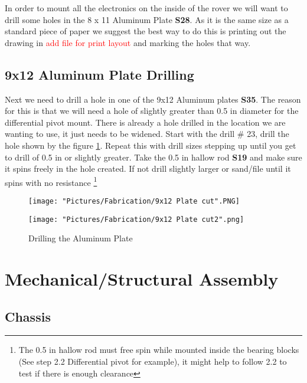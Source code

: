 \documentclass[12pt]{article}
\begin{document}
In order to mount all the electronics on the inside of the rover we will want to drill some holes in the 8 x 11 Aluminum Plate \textbf{S28}. As it is the same size as a standard piece of paper we suggest the best way to do this is printing out the drawing in \textcolor{red}{add file for print layout} and marking the holes that way. 

\subsection{9x12 Aluminum Plate Drilling}
Next we need to drill a hole in one of the 9x12 Aluminum plates \textbf{S35}. The reason for this is that we will need a hole of slightly greater than 0.5 in diameter for the differential pivot mount. There is already a hole drilled in the location we are wanting to use, it just needs to be widened. Start with the drill \# 23, drill the hole shown by the figure \ref{Drilling the Al plate}. Repeat this with drill sizes stepping up until you get to drill of 0.5 in or slightly greater. Take the 0.5 in hallow rod \textbf{S19} and make sure it spins freely in the hole created. If not drill slightly larger or sand/file until it spins with no resistance \footnote{The 0.5 in hallow rod must free spin while mounted inside the bearing blocks (See step 2.2 Differential pivot for example), it might help to follow 2.2 to test if there is enough clearance} 

\begin{figure}[H]
  \centering
  \begin{minipage}[b]{0.45\textwidth}
    \texttt{[image: "Pictures/Fabrication/9x12 Plate cut".PNG]}
  \end{minipage}
  \hfill
  \begin{minipage}[b]{0.45\textwidth}
    \texttt{[image: "Pictures/Fabrication/9x12 Plate cut2".png]}
  \end{minipage}
  \caption{Drilling the Aluminum Plate}
  \label{Drilling the Al plate}
\end{figure}

\newpage

\section{Mechanical/Structural Assembly}
\subsection{Chassis}
\end{document}
